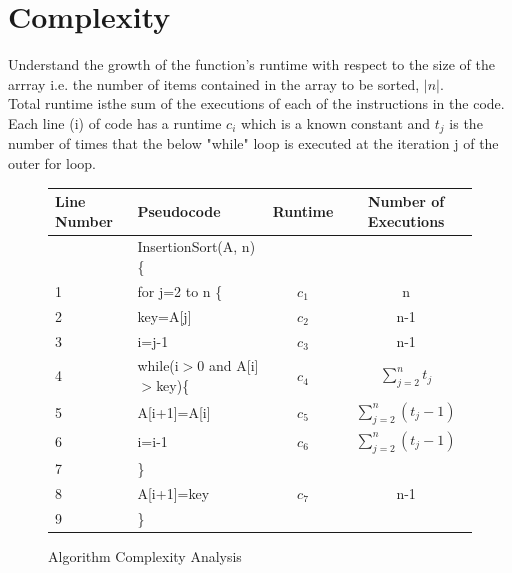 \documentclass[12pt,letterpaper]{article}
\begin{document}
\section{Complexity}
Understand the growth of the function's runtime with respect to the size of the arrray i.e. the number of items contained in the array to be sorted, $|n|$. \\
Total runtime isthe sum of the executions of each of the instructions in the code. Each line (i) of code has a runtime $c_i$ which is a known constant and $t_j$ is the number of times that the below "while" loop is executed at the iteration j of the outer for loop.
\begin{figure}[h]
\centering
\begin{tabular}{|l|l|c|c|}
\hline 
Line Number & Pseudocode & Runtime & Number of Executions \\ 
\hline 
  & InsertionSort(A, n) \{ &  &  \\ 
\hline 
1 & \hspace{.5cm}for j=2 to n \{ & $c_1$ & n \\ 
\hline 
2 &  \hspace{.5cm}key=A[j] & $c_2$ & n-1 \\ 
\hline 
3 &  \hspace{.5cm}i=j-1 & $c_3$ & n-1 \\ 
\hline 
4 & \hspace{.5cm} while(i$>$0 and A[i]$>$key)\{ & $c_4$ & $\displaystyle \sum_{j=2}^{n} t_j$ \\ 
\hline 
5 & \hspace{1cm}A[i+1]=A[i] & $c_5$ & $\displaystyle \sum_{j=2}^{n}( t_j-1)$ \\ 
\hline 
6 & \hspace{1cm}i=i-1 & $c_6$ & $\displaystyle \sum_{j=2}^{n}( t_j-1)$ \\ 
\hline 
7 & \hspace{.5cm}\} &  &  \\ 
\hline 
8 & \hspace{.5cm}A[i+1]=key & $c_7$ & n-1 \\ 
\hline 
9 & \} &  &  \\ 
\hline 
\end{tabular}
\caption{Algorithm Complexity Analysis}
\end{figure}
\end{document}
